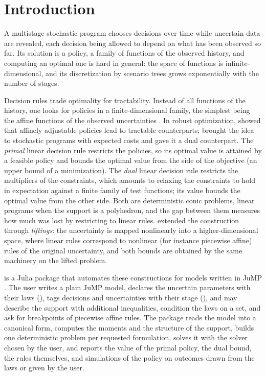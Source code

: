 \section{Introduction}
\label{sec:introduction}

A multistage stochastic program chooses decisions over time while uncertain data are revealed,
each decision being allowed to depend on what has been observed so far.
Its solution is a policy, a family of functions of the observed history,
and computing an optimal one is hard in general:
the space of functions is infinite-dimensional,
and its discretization by scenario trees grows exponentially with the number of stages.

Decision rules trade optimality for tractability.
Instead of all functions of the history, one looks for policies in a finite-dimensional family,
the simplest being the affine functions of the observed uncertainties \citep{GarstkaWets1974}.
In robust optimization, \citet{BenTal2004} showed that affinely adjustable policies lead to tractable counterparts;
\citet{KWG2011} brought the idea to stochastic programs with expected costs
and gave it a dual counterpart.
The \emph{primal} linear decision rule restricts the policies, so its optimal value is attained by a feasible policy
and bounds the optimal value from the side of the objective (an upper bound of a minimization).
The \emph{dual} linear decision rule restricts the multipliers of the constraints,
which amounts to relaxing the constraints to hold in expectation against a finite family of test functions;
its value bounds the optimal value from the other side.
Both are deterministic conic problems, linear programs when the support is a polyhedron,
and the gap between them measures how much was lost by restricting to linear rules.
\citet{GWK2015} extended the construction through \emph{liftings}:
the uncertainty is mapped nonlinearly into a higher-dimensional space,
where linear rules correspond to nonlinear (for instance piecewise affine) rules of the original uncertainty,
and both bounds are obtained by the same machinery on the lifted problem.

\pkg{} is a Julia package that automates these constructions
for models written in JuMP \citep{JuMP2023}.
The user writes a plain JuMP model, declares the uncertain parameters with their laws
(),
tags decisions and uncertainties with their stage (),
and may describe the support with additional inequalities,
condition the laws on a set,
and ask for breakpoints of piecewise affine rules.
The package reads the model into a canonical form,
computes the moments and the structure of the support,
builds one deterministic problem per requested formulation,
solves it with the solver chosen by the user,
and reports the value of the primal policy, the dual bound, the rules themselves,
and simulations of the policy on outcomes drawn from the laws or given by the user.

